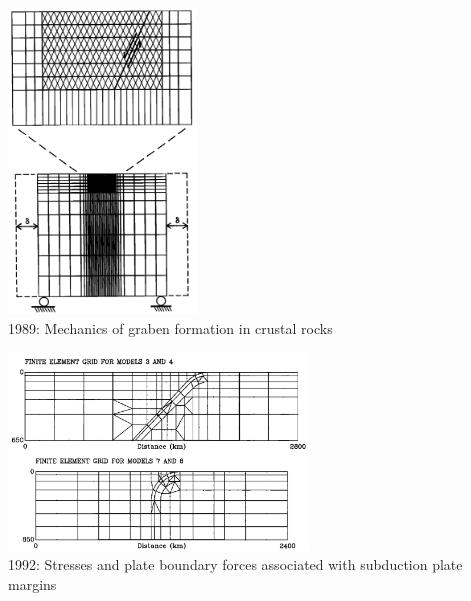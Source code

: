 \begin{center}
\begin{minipage}{0.35\textwidth}
\centering
\includegraphics[width=5cm]{images/history/mewi89}\\
{\small 1989: Mechanics of graben formation in crustal rocks \cite{mewi89}}
\end{minipage}\hfill
\begin{minipage}{0.55\textwidth}
\centering
\includegraphics[width=8cm]{images/history/whbw92}\\
{\small 1992: Stresses and plate boundary forces associated with subduction plate margins
\cite{whbw92}}
\end{minipage}
\end{center}


